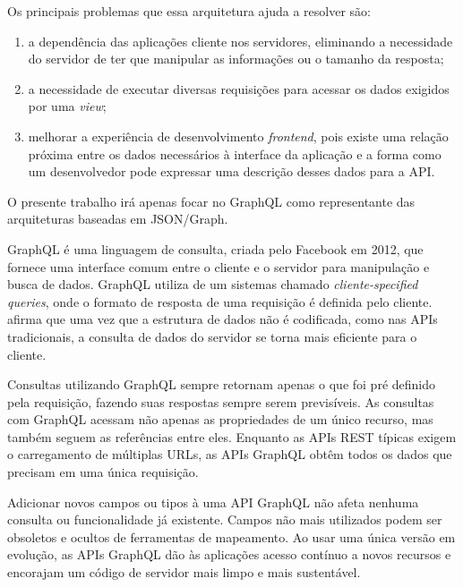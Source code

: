 Os principais problemas que essa arquitetura ajuda a resolver são: 

\begin{enumerate}[label=\alph*)]

\item a dependência das aplicações cliente nos servidores, eliminando a necessidade do servidor de ter que manipular as informações ou o tamanho da resposta; 

\item a necessidade de executar diversas requisições para acessar os dados exigidos por uma \textit{view};

\item melhorar a experiência de desenvolvimento \textit{frontend}, pois existe uma relação próxima entre os dados necessários à interface da aplicação e a forma como um desenvolvedor pode expressar uma descrição desses dados para a API. 

\end{enumerate}

O presente trabalho irá apenas focar no GraphQL como representante das arquiteturas baseadas em JSON/Graph.

GraphQL é uma linguagem de consulta, criada pelo Facebook em 2012, que fornece uma interface comum entre o cliente e o servidor para manipulação e busca de dados. GraphQL utiliza de um sistemas chamado \textit{cliente-specified queries}, onde o formato de resposta de uma requisição é definida pelo cliente.  afirma que uma vez que a estrutura de dados não é codificada, como nas APIs tradicionais, a consulta de dados do servidor se torna mais eficiente para o cliente.

Consultas utilizando GraphQL sempre retornam apenas o que foi pré definido pela requisição, fazendo suas respostas sempre serem previsíveis. As consultas com GraphQL acessam não apenas as propriedades de um único recurso, mas também seguem as referências entre eles. Enquanto as APIs REST típicas exigem o carregamento de múltiplas URLs, as APIs GraphQL obtêm todos os dados que precisam em uma única requisição.

Adicionar novos campos ou tipos à uma API GraphQL não afeta nenhuma consulta ou funcionalidade já existente. Campos não mais utilizados podem ser obsoletos e ocultos de ferramentas de mapeamento. Ao usar uma única versão em evolução, as APIs GraphQL dão às aplicações acesso contínuo a novos recursos e encorajam um código de servidor mais limpo e mais sustentável.

